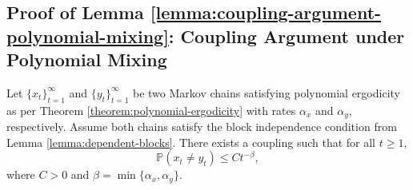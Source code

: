 \subsection{Proof of Lemma \ref{lemma:coupling-argument-polynomial-mixing}: Coupling Argument under Polynomial Mixing}
\label{app:proof-coupling-argument-polynomial-mixing}
\begin{lemmaapp*}
Let \(\{x_t\}_{t=1}^\infty\) and \(\{y_t\}_{t=1}^\infty\) be two Markov chains satisfying polynomial ergodicity as per Theorem \ref{theorem:polynomial-ergodicity} with rates \(\alpha_x\) and \(\alpha_y\), respectively. Assume both chains satisfy the block independence condition from Lemma \ref{lemma:dependent-blocks}. There exists a coupling such that for all \(t \geq 1\),
\[
\mathbb{P}(x_t \neq y_t) \leq C t^{-\beta},
\]
where \(C > 0\) and \(\beta = \min\{\alpha_x, \alpha_y\}\).
\end{lemmaapp*}
